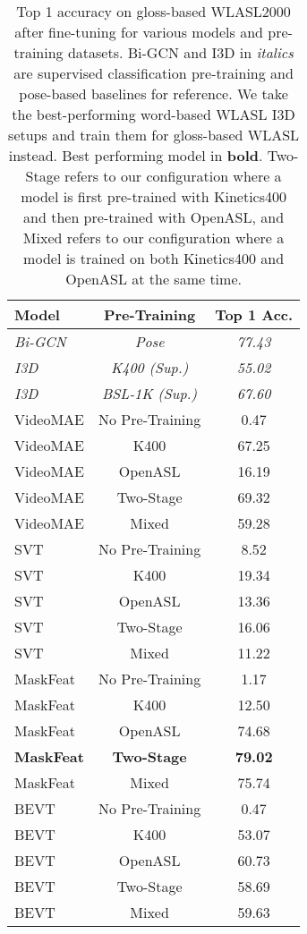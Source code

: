 \begin{table}[]
\centering
\begin{tabular}{lcc}
\hline
\textbf{Model} & \textbf{Pre-Training} & \textbf{Top 1 Acc.} \\
\hline
\textit{Bi-GCN} & \textit{Pose} & \textit{77.43} \\
\textit{I3D} & \textit{K400 (Sup.)} & \textit{55.02} \\
\textit{I3D} & \textit{BSL-1K (Sup.)} & \textit{67.60} \\
\hline
VideoMAE & No Pre-Training & 0.47 \\
VideoMAE & K400 & 67.25 \\
VideoMAE & OpenASL & 16.19 \\
VideoMAE & Two-Stage & 69.32 \\
VideoMAE & Mixed & 59.28 \\
\hline
SVT & No Pre-Training & 8.52 \\
SVT & K400 & 19.34 \\
SVT & OpenASL & 13.36 \\
SVT & Two-Stage & 16.06 \\
SVT & Mixed & 11.22 \\
\hline
MaskFeat & No Pre-Training & 1.17 \\
MaskFeat & K400 & 12.50 \\
MaskFeat & OpenASL & 74.68 \\
\textbf{MaskFeat} & \textbf{Two-Stage} & \textbf{79.02} \\
MaskFeat & Mixed & 75.74 \\
\hline
BEVT & No Pre-Training & 0.47 \\
BEVT & K400 & 53.07 \\
BEVT & OpenASL & 60.73 \\
BEVT & Two-Stage & 58.69 \\
BEVT & Mixed & 59.63 \\
\hline
\end{tabular}
\caption{Top 1 accuracy on gloss-based WLASL2000 after fine-tuning for various models and pre-training datasets. Bi-GCN and I3D in \textit{italics} are supervised classification pre-training and pose-based baselines for reference. We take the best-performing word-based WLASL I3D setups and train them for gloss-based WLASL instead. Best performing model in \textbf{bold}. Two-Stage refers to our configuration where a model is first pre-trained with Kinetics400 and then pre-trained with OpenASL, and Mixed refers to our configuration where a model is trained on both Kinetics400 and OpenASL at the same time.}
\label{tab:wlasl-performance}
\end{table}

